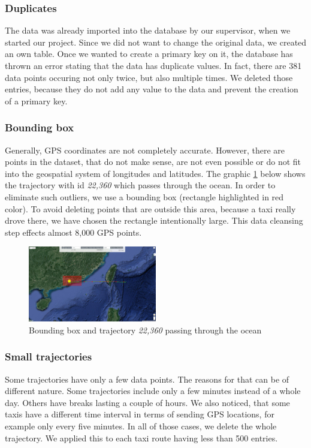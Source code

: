 \documentclass[10pt]{sig-alternate}
\begin{document}
\subsubsection{Duplicates}
The data was already imported into the database by our supervisor, when we started our project. Since we did not want to change the original data, we created an own table. Once we wanted to create a primary key on it, the database has thrown an error stating that the data has duplicate values. In fact, there are 381 data points occuring not only twice, but also multiple times. We deleted those entries, because they do not add any value to the data and prevent the creation of a primary key.

\subsubsection{Bounding box}
Generally, GPS coordinates are not completely accurate. However, there are points in the dataset, that do not make sense, are not even possible or do not fit into the geospatial system of longitudes and latitudes. The graphic \ref{fig:bbox} below shows the trajectory with id \textit{22,360} which passes through the ocean. In order to eliminate such outliers, we use a bounding box (rectangle highlighted in red color). To avoid deleting points that are outside this area, because a taxi really drove there, we have chosen the rectangle intentionally large. This data cleansing step effects almost 8,000 GPS points.

\begin{figure}[ht]
\centering
\includegraphics[width=0.5\textwidth]{img/bounding_box.png}
\caption{Bounding box and trajectory \textit{22,360} passing through the ocean}
\label{fig:bbox}
\end{figure}


\subsubsection{Small trajectories}
Some trajectories have only a few data points. The reasons for that can be of different nature. Some trajectories include only a few minutes instead of a whole day. Others have breaks lasting a couple of hours. We also noticed, that some taxis have a different time interval in terms of sending GPS locations, for example only every five minutes. In all of those cases, we delete the whole trajectory. We applied this to each taxi route having less than 500 entries.
\end{document}
